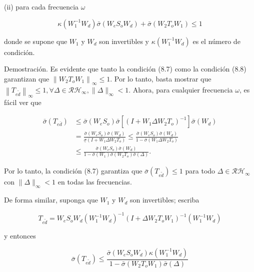 (ii) para cada frecuencia $\omega$


\begin{equation*}
\kappa\left(W_{1}^{-1} W_{d}\right) \bar{\sigma}\left(W_{e} S_{o} W_{d}\right)+\bar{\sigma}\left(W_{2} T_{o} W_{1}\right) \leq 1 \tag{8.8}
\end{equation*}


donde se supone que $W_{1}$ y $W_{d}$ son invertibles y $\kappa\left(W_{1}^{-1} W_{d}\right)$ es el número de condición.

Demostración. Es evidente que tanto la condición (8.7) como la condición (8.8) garantizan que $\left\|W_{2} T_{o} W_{1}\right\|_{\infty} \leq 1$. Por lo tanto, basta mostrar que $\left\|T_{e \tilde{d}}\right\|_{\infty} \leq 1, \forall \Delta \in \mathcal{R} \mathcal{H}_{\infty},\|\Delta\|_{\infty}<1$. Ahora, para cualquier frecuencia $\omega$, es fácil ver que

$$
\begin{aligned}
\bar{\sigma}\left(T_{e \bar{d}}\right) & \leq \bar{\sigma}\left(W_{e} S_{o}\right) \bar{\sigma}\left[\left(I+W_{1} \Delta W_{2} T_{o}\right)^{-1}\right] \bar{\sigma}\left(W_{d}\right) \\
& =\frac{\bar{\sigma}\left(W_{e} S_{o}\right) \bar{\sigma}\left(W_{d}\right)}{\underline{\sigma}\left(I+W_{1} \Delta W_{2} T_{o}\right)} \leq \frac{\bar{\sigma}\left(W_{e} S_{o}\right) \bar{\sigma}\left(W_{d}\right)}{1-\bar{\sigma}\left(W_{1} \Delta W_{2} T_{o}\right)} \\
& \leq \frac{\bar{\sigma}\left(W_{e} S_{o}\right) \bar{\sigma}\left(W_{d}\right)}{1-\bar{\sigma}\left(W_{1}\right) \bar{\sigma}\left(W_{2} T_{o}\right) \bar{\sigma}(\Delta)} .
\end{aligned}
$$

Por lo tanto, la condición (8.7) garantiza que $\bar{\sigma}\left(T_{e \tilde{d}}\right) \leq 1$ para todo $\Delta \in \mathcal{R} \mathcal{H}_{\infty}$ con $\|\Delta\|_{\infty}<1$ en todas las frecuencias.

De forma similar, suponga que $W_{1}$ y $W_{d}$ son invertibles; escriba

$$
T_{e \tilde{d}}=W_{e} S_{o} W_{d}\left(W_{1}^{-1} W_{d}\right)^{-1}\left(I+\Delta W_{2} T_{o} W_{1}\right)^{-1}\left(W_{1}^{-1} W_{d}\right)
$$

y entonces

$$
\bar{\sigma}\left(T_{e \tilde{d}}\right) \leq \frac{\bar{\sigma}\left(W_{e} S_{o} W_{d}\right) \kappa\left(W_{1}^{-1} W_{d}\right)}{1-\bar{\sigma}\left(W_{2} T_{o} W_{1}\right) \bar{\sigma}(\Delta)}
$$

